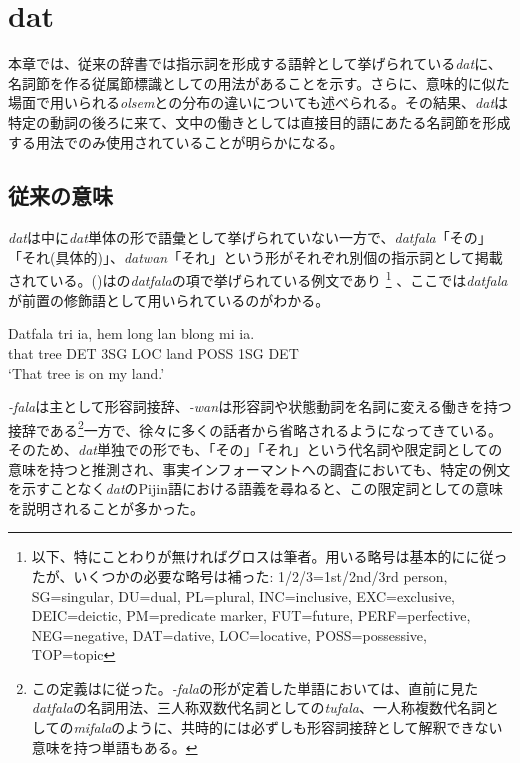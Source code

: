 \chapter{dat}

本章では、従来の辞書では指示詞を形成する語幹として挙げられている\textit{dat}に、名詞節を作る従属節標識としての用法があることを示す。さらに、意味的に似た場面で用いられる\textit{olsem}との分布の違いについても述べられる。その結果、\textit{dat}は特定の動詞の後ろに来て、文中の働きとしては直接目的語にあたる名詞節を形成する用法でのみ使用されていることが明らかになる。

\section{従来の意味}

\textit{dat}は\cite{dictionary}中に\textit{dat}単体の形で語彙として挙げられていない一方で、\textit{datfala}「その」「それ(具体的)」、\textit{datwan}「それ」という形がそれぞれ別個の指示詞として掲載されている。()は\cite{dictionary}の\textit{datfala}の項で挙げられている例文であり
\footnote{以下、特にことわりが無ければグロスは筆者。用いる略号は基本的に\cite{prepositions}に従ったが、いくつかの必要な略号は補った: 1/2/3=1st/2nd/3rd person, SG=singular, DU=dual, PL=plural, INC=inclusive, EXC=exclusive, DEIC=deictic, PM=predicate marker, FUT=future, PERF=perfective, NEG=negative, DAT=dative, LOC=locative, POSS=possessive, TOP=topic}
、ここでは\textit{datfala}が前置の修飾語として用いられているのがわかる。

\begin{exe}
  \ex
  \gll Datfala tri ia, hem long lan blong mi ia.\\
  that tree DET 3SG LOC land POSS 1SG DET\\
  \glt `That tree is on my land.'
\end{exe}

\textit{-fala}は主として形容詞接辞、\textit{-wan}は形容詞や状態動詞を名詞に変える働きを持つ接辞である\footnote{この定義は\cite{syntax}に従った。\textit{-fala}の形が定着した単語においては、直前に見た\textit{datfala}の名詞用法、三人称双数代名詞としての\textit{tufala}、一人称複数代名詞としての\textit{mifala}のように、共時的には必ずしも形容詞接辞として解釈できない意味を持つ単語もある。}一方で、徐々に多くの話者から省略されるようになってきている\citep{syntax}。
そのため、\textit{dat}単独での形でも、「その」「それ」という代名詞や限定詞としての意味を持つと推測され、事実インフォーマントへの調査においても、特定の例文を示すことなく\textit{dat}のPijin語における語義を尋ねると、この限定詞としての意味を説明されることが多かった。

